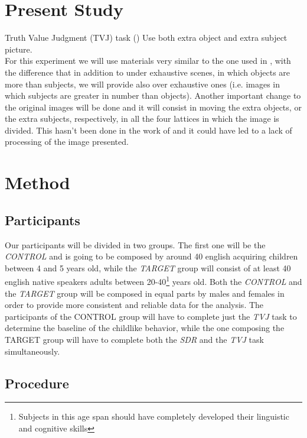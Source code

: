 \documentclass[10pt, a4]{article}
\begin{document}
\section{Present Study}
Truth Value Judgment (TVJ) task (\cite{crain2000investigations})
Use both extra object and extra subject picture.\\

For this experiment we will use materials very similar to the one used in \cite{minai2012hinders},
with the difference that in addition to under exhaustive scenes, in which objects are more than subjects,
we will provide also over exhaustive ones (i.e. images in which subjects are greater in number than objects).
Another important change to the original images will be done and it will consist in moving
the extra objects, or the extra subjects, respectively, in all the four lattices in which
the image is divided. This hasn't been done in the work of \cite{minai2012hinders} and it could
have led to a lack of processing of the image presented.


\section{Method}
\subsection{Participants}
Our participants will be divided in two groups. The first one will be the \textit{CONTROL} and is going to be
composed by around 40 english acquiring children between 4 and 5 years old, while the \textit{TARGET} group will consist
of at least 40 english native speakers adults between 20-40\footnote{Subjects in this age span should have completely developed
their linguistic and cognitive skills} years old. Both the \textit{CONTROL} and the \textit{TARGET} group will be composed in equal
parts by males and females in order to provide more consistent and reliable data for the analysis.
The participants of the CONTROL group will have to complete just the \textit{TVJ} task to determine the baseline of the childlike behavior,
while the one composing the TARGET group will have to complete both the \textit{SDR} and the \textit{TVJ} task simultaneously.

\subsection{Procedure}
\end{document}
